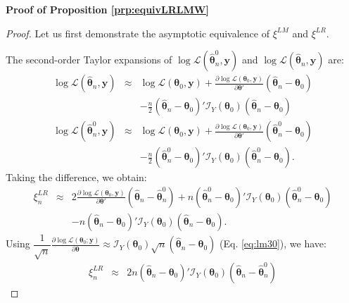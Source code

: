 \documentclass[
  11pt,
]{book}
\theoremstyle{definition}
\theoremstyle{definition}
\theoremstyle{definition}
\theoremstyle{definition}
\theoremstyle{remark}
\begin{document}
\textbf{Proof of Proposition \ref{prp:equivLRLMW}}

\begin{proof}
Let us first demonstrate the asymptotic equivalence of \(\xi^{LM}\) and \(\xi^{LR}\).

The second-order Taylor expansions of \(\log \mathcal{L}(\hat{\boldsymbol\theta}^0_n,\mathbf{y})\) and \(\log \mathcal{L}(\hat{\boldsymbol\theta}_n,\mathbf{y})\) are:
\begin{eqnarray*}
\log \mathcal{L}(\hat{\boldsymbol\theta}_n,\mathbf{y}) &\approx& \log \mathcal{L}(\boldsymbol\theta_0,\mathbf{y})
+ \frac{\partial \log \mathcal{L}(\boldsymbol\theta_0,\mathbf{y})}{\partial \boldsymbol\theta'}(\hat{\boldsymbol\theta}_n-\boldsymbol\theta_0) \\
&& - \frac{n}{2} (\hat{\boldsymbol\theta}_n-\boldsymbol\theta_0)' \mathcal{I}_Y(\boldsymbol\theta_0) (\hat{\boldsymbol\theta}_n-\boldsymbol\theta_0)\\
\log \mathcal{L}(\hat{\boldsymbol\theta}^0_n,\mathbf{y}) &\approx& \log \mathcal{L}(\boldsymbol\theta_0,\mathbf{y})
+ \frac{\partial \log \mathcal{L}(\boldsymbol\theta_0,\mathbf{y})}{\partial \boldsymbol\theta'}(\hat{\boldsymbol\theta}^0_n-\boldsymbol\theta_0) \\
&& - \frac{n}{2} (\hat{\boldsymbol\theta}^0_n-\boldsymbol\theta_0)' \mathcal{I}_Y(\boldsymbol\theta_0) (\hat{\boldsymbol\theta}^0_n-\boldsymbol\theta_0).
\end{eqnarray*}
Taking the difference, we obtain:
\begin{eqnarray*}
\xi_n^{LR} &\approx& 2\frac{\partial \log \mathcal{L}(\boldsymbol\theta_0,\mathbf{y})}{\partial \boldsymbol\theta'}
(\hat{\boldsymbol\theta}_n-\hat{\boldsymbol\theta}^0_n) + n (\hat{\boldsymbol\theta}^0_n-\boldsymbol\theta_0)' \mathcal{I}_Y(\boldsymbol\theta_0) (\hat{\boldsymbol\theta}^0_n-\boldsymbol\theta_0)\\
&& - n (\hat{\boldsymbol\theta}_n-\boldsymbol\theta_0)' \mathcal{I}_Y(\boldsymbol\theta_0) (\hat{\boldsymbol\theta}_n-\boldsymbol\theta_0).
\end{eqnarray*}
Using \(\dfrac{1}{\sqrt{n}}\frac{\partial \log \mathcal{L}(\boldsymbol\theta_0;\mathbf{y})}{\partial \boldsymbol\theta} \approx
\mathcal{I}_Y(\boldsymbol\theta_0)\sqrt{n}(\hat{\boldsymbol\theta}_n-\boldsymbol\theta_0)\) (Eq. \eqref{eq:lm30}), we have:
\begin{eqnarray*}
\xi_n^{LR} &\approx&
2n(\hat{\boldsymbol\theta}_n-\boldsymbol\theta_0)'\mathcal{I}_Y(\boldsymbol\theta_0)
(\hat{\boldsymbol\theta}_n-\hat{\boldsymbol\theta}^0_n)

\end{eqnarray*}
\end{proof}
\end{document}
